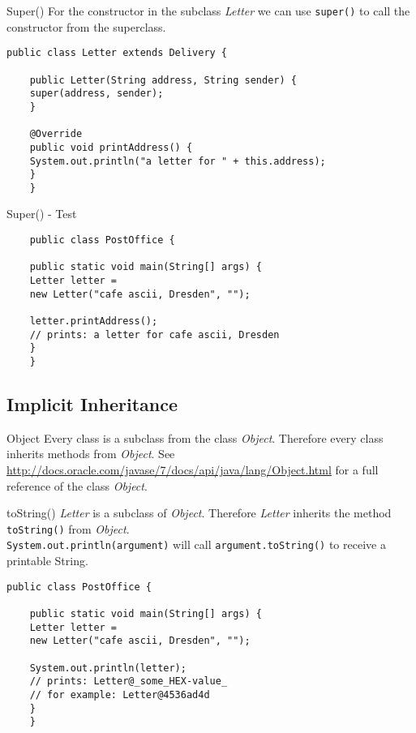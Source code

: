 \begin{frame}[fragile]{Super()}
	For the constructor in the subclass \emph{Letter} we can use \texttt{super()} to call the constructor
	from the superclass.
	\begin{lstlisting}[escapechar=!]
	public class Letter extends Delivery {
	
	public Letter(String address, String sender) {
	super(address, sender);
	}
	
	@Override
	public void printAddress() {
	System.out.println("a letter for " + this.address);    
	}	
	}
	\end{lstlisting}
\end{frame}

\begin{frame}[fragile]{Super() - Test}
	\begin{lstlisting}
	public class PostOffice {
	
	public static void main(String[] args) {	    
	Letter letter = 
	new Letter("cafe ascii, Dresden", "");
	
	letter.printAddress();
	// prints: a letter for cafe ascii, Dresden
	}
	}
	\end{lstlisting}
\end{frame}

\subsection{Implicit Inheritance}
\begin{frame}{Object}
	Every class is a subclass from the class \emph{Object}. 
	Therefore every class inherits methods from \emph{Object}.
	\vfill
	See \scriptsize\url{http://docs.oracle.com/javase/7/docs/api/java/lang/Object.html} \normalsize for
	a full reference of the class \emph{Object}.
\end{frame}

\begin{frame}[fragile]{toString()}
	\emph{Letter} is a subclass of \emph{Object}.
	Therefore \emph{Letter} inherits the method \texttt{toString()} from \emph{Object}.\\
	\texttt{System.out.println(argument)} will call \texttt{argument.toString()} to receive
	a printable String.
	\begin{lstlisting}[escapechar=!]
	public class PostOffice {
	
	public static void main(String[] args) {	    
	Letter letter = 
	new Letter("cafe ascii, Dresden", "");
	
	System.out.println(letter);
	// prints: Letter@_some_HEX-value_
	// for example: Letter@4536ad4d
	}
	}
	\end{lstlisting}
\end{frame}

